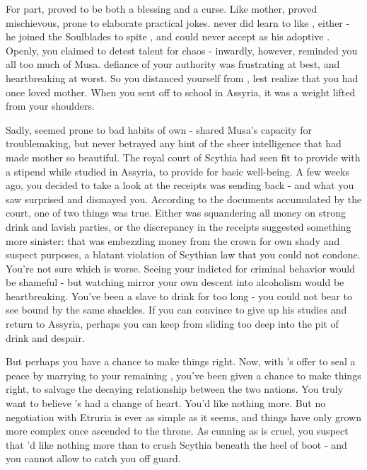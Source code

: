 \documentclass[char]{Kos}
\begin{document}
    For \cWard{\their} part, \cWard{} proved to be both a blessing and a curse. Like \cWard{\their} mother, \cWard{\they} proved mischievous, prone to elaborate practical jokes. \cWard{\They} never did learn to like \cScythiaQueen{}, either - he joined the Soulblades to spite \cScythiaQueen{\them}, and could never accept \cScythiaQueen{\them} as his adoptive \cScythiaQueen{\parent}. Openly, you claimed to detest \cWard{\their} talent for chaos - inwardly, however, \cWard{\they} reminded you all too much of Musa. \cWard{\Their} defiance of your authority was frustrating at best, and heartbreaking at worst. So you distanced yourself from \cWard{\them}, lest \cScythiaQueen{} realize that you had once loved \cWard{\their} mother. When you sent \cWard{} off to school in Assyria, it was a weight lifted from your shoulders.

    Sadly, \cWard{} seemed prone to bad habits of \cWard{\their} own - \cWard{\they} shared Musa's capacity for troublemaking, but never betrayed any hint of the sheer intelligence that had made \cWard{\their} mother so beautiful. The royal court of Scythia had seen fit to provide  with a stipend while \cWard{\they} studied in Assyria, to provide for \cWard{\their} basic well-being. A few weeks ago, you decided to take a look at the receipts \cWard{} was sending back - and what you saw surprised and dismayed you. According to the documents accumulated by the court, one of two things was true. Either \cWard{} was squandering all \cWard{\their} money on strong drink and lavish parties, or the discrepancy in the receipts suggested something more sinister: that \cWard{\they} was embezzling money from the crown for \cWard{\their} own shady and suspect purposes, a blatant violation of Scythian law that you could not condone. You're not sure which is worse. Seeing your \cWard{\offspring} indicted for criminal behavior would be shameful - but watching \cWard{\them} mirror your own descent into alcoholism would be heartbreaking. You've been a slave to drink for too long - you could not bear to see \cWard{\them} bound by the same shackles. If you can convince \cWard{\them} to give up his studies and return to Assyria, perhaps you can keep \cWard{\them} from sliding too deep into the pit of drink and despair.

    But perhaps you have a chance to make things right. Now, with \cEtruriaKing{\Monarch} \cEtruriaKing{}'s offer to seal a peace by marrying \cEtruriaKing{\their} \cGroom{\offspring} \cGroom{} to your remaining \cBride{\offspring} \cBride{}, you've been given a chance to make things right, to salvage the decaying relationship between the two nations. You truly want to believe \cEtruriaKing{\they}'s had a change of heart. You'd like nothing more. But no negotiation with Etruria is ever as simple as it seems, and things have only grown more complex once \cEtruriaKing{} ascended to the throne. As cunning as \cEtruriaKing{\they} is cruel, you suspect that \cEtruriaKing{\they}'d like nothing more than to crush Scythia beneath the heel of \cEtruriaKing{\their} boot - and you cannot allow \cEtruriaKing{\them} to catch you off guard. 
\end{document}
